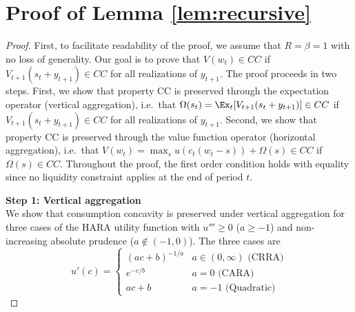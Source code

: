 \documentclass[titlepage]{\econtex}
\begin{document}
\clearpage\pagebreak



\vfill\eject
\appendix

  



  \section{Proof of Lemma \ref{lem:recursive}}\label{app:recursive}

  \begin{proof}
    First, to facilitate readability of the proof, we assume that $R = \beta = 1$ with no loss of generality. Our goal is to prove that $V(w_t) \in CC$ if $V_{t+1}(s_t + {y}_{t+1}) \in CC$ for all realizations of ${y}_{t+1}$. The proof proceeds in two steps. First, we show that property CC is preserved through the expectation operator (vertical aggregation), i.e.\ that $\Omega(s_t) = \Ex_t[V_{t+1}(s_t + {y}_{t+1})] \in CC$ if $V_{t+1}(s_t + {y}_{t+1}) \in CC$ for all realizations of ${y}_{t+1}$. Second, we show that property CC is preserved through the value function operator (horizontal aggregation), i.e.\ that $V(w_t) = \max_{s} u(c_t(w_t - s)) + \Omega(s) \in CC$ if $\Omega(s) \in CC$. Throughout the proof, the first order condition holds with equality since no liquidity constraint applies at the end of period $t$. 
    
    \bigskip
    \noindent \textbf{Step 1: Vertical aggregation} \\ 
    \noindent We show that consumption concavity is preserved under vertical aggregation for three cases of the HARA utility function with $u''' \geq 0$ ($a \geq -1$) and non-increasing absolute prudence ($a \notin (-1,0)$). The three cases are
    \begin{equation}\label{eq:HARAmu}u'(c) = \begin{cases} \left(ac + b\right)^{-1/a} & a \in (0,\infty) \text{ (CRRA)} \\
	e^{-c/b} & a = 0 \text{ (CARA)}\\
	ac + b & a = -1 \text{ (Quadratic)}\end{cases} \end{equation}
    

\end{proof}
\end{document}

